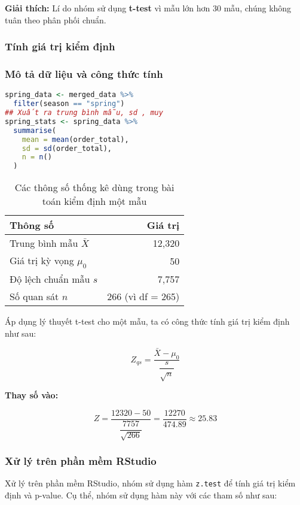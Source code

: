 \begin{boxH}
\textbf{Giải thích:} Lí do nhóm sử dụng \textbf{t-test} vì mẫu lớn hơn 30 mẫu, chúng không tuân theo phân phối chuẩn.
\end{boxH}



\subsubsection{Tính giá trị kiểm định}


\subsubsection{Mô tả dữ liệu và công thức tính}

\begin{lstlisting}[language=R, caption=Tính các thông số]
spring_data <- merged_data %>%
  filter(season == "spring")
## Xuất ra trung bình mẫu, sd , muy
spring_stats <- spring_data %>%
  summarise(
    mean = mean(order_total),
    sd = sd(order_total),
    n = n()
  )  
\end{lstlisting}

\begin{table}[h!]
\centering
\begin{tabular}{|l|r|}
\hline
\textbf{Thông số} & \textbf{Giá trị} \\
\hline
Trung bình mẫu \( \bar{X} \) & 12,320 \\
Giá trị kỳ vọng \( \mu_0 \) & 50 \\
Độ lệch chuẩn mẫu \( s \) & 7,757 \\
Số quan sát \( n \) & 266 (vì df = 265) \\
\hline
\end{tabular}
\caption{Các thông số thống kê dùng trong bài toán kiểm định một mẫu}
\label{tab:thongso}
\end{table}

Áp dụng lý thuyết t-test cho một mẫu, ta có công thức tính giá trị kiểm định như sau:
\begin{boxH}
\[
Z_{qs} = \frac{\bar{X} - \mu_0}{\dfrac{s}{\sqrt{n}}}
\]

\textbf{Thay số vào:}

\[
Z = \frac{12320 - 50}{\dfrac{7757}{\sqrt{266}}}
= \frac{12270}{474.89} \approx 25.83
\]
\end{boxH}

\subsubsection{Xử lý trên phần mềm RStudio}
Xử lý trên phần mềm RStudio, nhóm sử dụng hàm \texttt{z.test} để tính giá trị kiểm định và p-value. Cụ thể, nhóm sử dụng hàm này với các tham số như sau:

